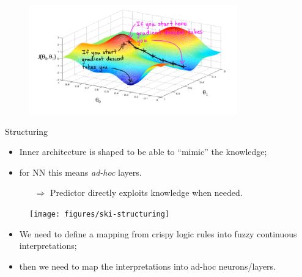 \documentclass[presentation]{beamer}\mode<presentation>{\usetheme{AMSBolognaFC}}
\begin{document}
\begin{frame}[allowframebreaks]{\skilong}
{        \begin{figure}
            \centering
            \includegraphics[width=0.8\textwidth]{figures/nn-gradient-descent.png}
        \end{figure}
        
        \framebreak
        
        \begin{block}{Structuring}
            \begin{itemize}
                \item Inner architecture is shaped to be able to ``mimic'' the knowledge;
                \item for NN this means \emph{ad-hoc} layers.
                \begin{itemize}
                    \item[$\Rightarrow$] Predictor directly exploits knowledge when needed.
                \end{itemize} 
            \end{itemize}
        \end{block}
        
        \begin{figure}
            \centering
            \texttt{[image: figures/ski-structuring]}
        \end{figure}
        
        \framebreak
        
        \begin{itemize}
            \item We need to define a mapping from crispy logic rules into fuzzy continuous interpretations;
            \item then we need to map the interpretations into ad-hoc neurons/layers.
        \end{itemize}
        
}
\end{frame}
\end{document}
